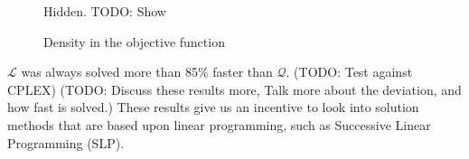 \begin{figure}[ht!]
\begin{center}
    Hidden. TODO: Show
%    
\end{center}
\caption{Density in the objective function}
\label{fig:sparsobj}
\end{figure}

$\mathcal{L}$ was always solved more than 85\% faster than $\mathcal{Q}$.
(TODO: Test against CPLEX)
(TODO: Discuss these results more, Talk more about the deviation, and how fast
is solved.)
These results give us an incentive to look into solution methods that are based
upon linear programming, such as Successive Linear Programming (SLP).
